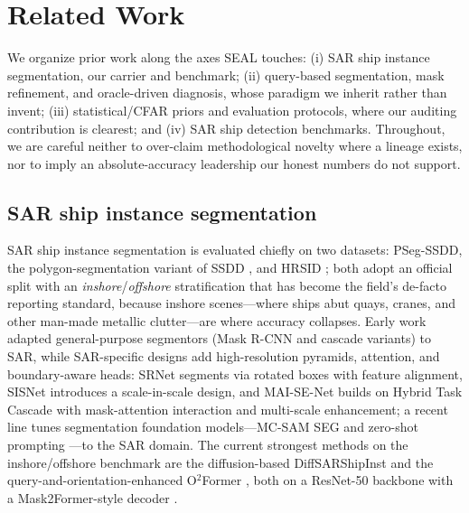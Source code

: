 \documentclass[journal]{IEEEtran}
\begin{document}
\section{Related Work}
\label{sec:related}
We organize prior work along the axes SEAL touches: (i) SAR ship instance segmentation, our carrier and benchmark; (ii) query-based segmentation, mask refinement, and oracle-driven diagnosis, whose paradigm we inherit rather than invent; (iii) statistical/CFAR priors and evaluation protocols, where our auditing contribution is clearest; and (iv) SAR ship detection benchmarks. Throughout, we are careful neither to over-claim methodological novelty where a lineage exists, nor to imply an absolute-accuracy leadership our honest numbers do not support.

\subsection{SAR ship instance segmentation}
SAR ship instance segmentation is evaluated chiefly on two datasets: PSeg-SSDD, the polygon-segmentation variant of SSDD \cite{zhang2021ssdd}, and HRSID \cite{wei2020hrsid}; both adopt an official split with an \emph{inshore}/\emph{offshore} stratification that has become the field's de-facto reporting standard, because inshore scenes---where ships abut quays, cranes, and other man-made metallic clutter---are where accuracy collapses. Early work adapted general-purpose segmentors (Mask R-CNN and cascade variants) to SAR, while SAR-specific designs add high-resolution pyramids, attention, and boundary-aware heads: SRNet \cite{yang2023srnet} segments via rotated boxes with feature alignment, SISNet \cite{shao2023scaleinscale} introduces a scale-in-scale design, and MAI-SE-Net \cite{zhang2022maisenet} builds on Hybrid Task Cascade with mask-attention interaction and multi-scale enhancement; a recent line tunes segmentation foundation models---MC-SAM SEG \cite{zheng2024mcsamseg} and zero-shot prompting \cite{mansour2026zeroshot}---to the SAR domain. The current strongest methods on the inshore/offshore benchmark are the diffusion-based DiffSARShipInst \cite{xu2025diffsarshipinst} and the query-and-orientation-enhanced O$^2$Former \cite{gao2025o2former}, both on a ResNet-50 backbone with a Mask2Former-style decoder \cite{cheng2022mask2former}.
\end{document}
